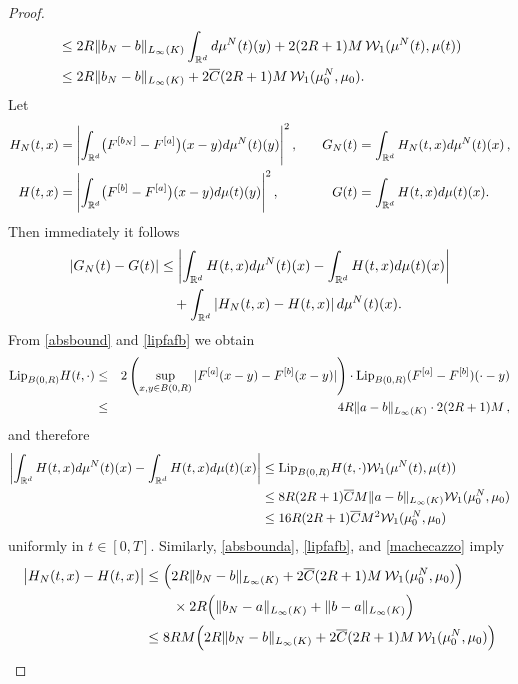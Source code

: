 \begin{proof}
\begin{align}
			&\leq 2R \| b_{N}-b\|_{L_\infty(K)}\int_{\mathbb{R}^d}d\mu^{N}(t)(y)+ 2(2R+1)M\,\mathcal{W}_1(\mu^N(t),\mu(t))\\ \nonumber
			&\leq 2R \| b_{N}-b\|_{L_\infty(K)}+2 \overline{C}(2R+1)M\,\mathcal{W}_1(\mu_0^N,\mu_0). 
	\end{align}
Let
	\begin{align*}
		H_N(t,x)&=\Biggl|\int_{\mathbb{R}^d}\bigl(F^{[b_{N}]}-F^{[a]}\bigr)(x-y)d\mu^{N}(t)(y)\Biggr|^2\,,\quad
		&G_N(t)&= \int_{\mathbb{R}^d}H_N(t,x)d\mu^N(t)(x)\,,\\
		H(t,x)&= \Biggl|\int_{\mathbb{R}^d}\bigl(F^{[b]}-F^{[a]}\bigr)(x-y)d\mu(t)(y)\Biggr|^2\,,
		&G(t)&= \int_{\mathbb{R}^d}H(t,x)d\mu(t)(x).
	\end{align*}
	Then immediately it follows
	\begin{align}
		|G_N(t)-G(t)|&\leq \left|\int_{\mathbb{R}^d}H(t,x)d\mu^N(t)(x) - \int_{\mathbb{R}^d}H(t,x)d\mu(t)(x)\right| \nonumber\\
		&\quad + \int_{\mathbb{R}^d}\left|H_N(t,x) - H(t,x)\right|d\mu^N(t)(x). \label{aux3}
	\end{align}
From \eqref{absbound} and \eqref{lipfafb} we obtain
\begin{eqnarray*}
\textup{Lip}_{B(0,R)}H(t,\cdot)&\leq& 2 \left (\sup_{x,y \in B(0,R)}|F^{[a]}(x-y)-F^{[b]}(x-y)| \right ) \cdot\textup{Lip}_{B(0,R)}(F^{[a]} -F^{[b]})(\cdot -y) \\
&\leq& 4R\|a-b\|_{L_\infty(K)}\cdot 2(2R+1)M\,,
\end{eqnarray*}
and therefore
	\begin{align}\label{aux1}
		\left|\int_{\mathbb{R}^d}H(t,x)d\mu^N(t)(x) - \int_{\mathbb{R}^d}H(t,x)d\mu(t)(x)\right|
			&\leq\textup{Lip}_{B(0,R)}H(t,\cdot)\mathcal{W}_1(\mu^N(t),\mu(t))\nonumber\\
			&\leq 8R(2R+1)\overline{C}M\|a-b\|_{L_\infty(K)}\mathcal{W}_1(\mu_0^N,\mu_0)\nonumber\\
			&\leq 16R(2R+1)\overline{C}M^2 \mathcal{W}_1(\mu_0^N,\mu_0)
	\end{align}
	uniformly in $t \in [0,T]$. Similarly, \eqref{absbounda}, \eqref{lipfafb}, and \eqref{machecazzo} imply
	\begin{align}\label{aux2}
		\bigl|H_N(t,x)-H(t,x)\bigr|
			&\leq \Bigl(2R \| b_{N}-b\|_{L_\infty(K)}+2 \overline{C}(2R+1)M\,\mathcal{W}_1(\mu_0^N,\mu_0)\Bigr)\nonumber\\
			&\qquad\times
				2R\Bigl(\|b_N-a\|_{L_\infty(K)}+\|b-a\|_{L_\infty(K)}\Bigr)\nonumber\\
			&\leq 8RM\Bigl(2R \| b_{N}-b\|_{L_\infty(K)}+2\overline{C}(2R+1)M\,\mathcal{W}_1(\mu_0^N,\mu_0)\Bigr)

\end{align}
\end{proof}
